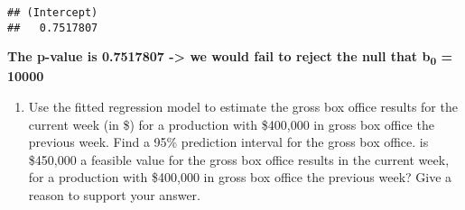 \documentclass[
]{article}
\newenvironment{Shaded}{\begin{snugshade}}{\end{snugshade}}
\newcommand{\CommentTok}[1]{\textcolor[rgb]{0.56,0.35,0.01}{\textit{#1}}}
\newcommand{\DecValTok}[1]{\textcolor[rgb]{0.00,0.00,0.81}{#1}}
\newcommand{\FunctionTok}[1]{\textcolor[rgb]{0.00,0.00,0.00}{#1}}
\newcommand{\NormalTok}[1]{#1}
\newcommand{\OtherTok}[1]{\textcolor[rgb]{0.56,0.35,0.01}{#1}}
\newcommand{\SpecialCharTok}[1]{\textcolor[rgb]{0.00,0.00,0.00}{#1}}
\providecommand{\tightlist}{%
  \setlength{\itemsep}{0pt}\setlength{\parskip}{0pt}}
\begin{document}
\begin{Shaded}
\end{Shaded}

\begin{verbatim}
## (Intercept) 
##   0.7517807
\end{verbatim}

\textbf{The p-value is 0.7517807 -\textgreater{} we would fail to reject
the null that b\textsubscript{0} = 10000}

\begin{enumerate}
\def\labelenumi{(\alph{enumi})}
\setcounter{enumi}{2}
\tightlist
\item
  Use the fitted regression model to estimate the gross box office
  results for the current week (in \$) for a production with \$400,000
  in gross box office the previous week. Find a 95\% prediction interval
  for the gross box office. is \$450,000 a feasible value for the gross
  box office results in the current week, for a production with
  \$400,000 in gross box office the previous week? Give a reason to
  support your answer.
\end{enumerate}
\end{document}
